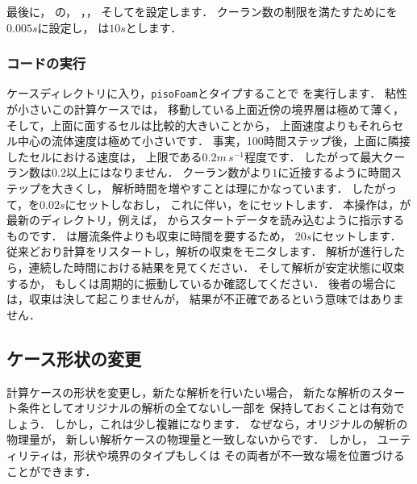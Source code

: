 最後に，
%
%
の，
，，
そしてを設定します．
クーラン数の制限を満たすためにを$0.005\unit{s}$に設定し，
は$10\unit{s}$とします．

\subsubsection{コードの実行}
\label{sssec:2.1.8.2}
ケースディレクトリに入り，\texttt{pisoFoam}とタイプすることで
を実行します．
粘性が小さいこの計算ケースでは，
移動している上面近傍の境界層は極めて薄く，
そして，上面に面するセルは比較的大きいことから，
上面速度よりもそれらセル中心の流体速度は極めて小さいです．
事実，100時間ステップ後，上面に隣接したセルにおける速度は，
上限である$0.2\unit{m\,s^{-1}}$程度です．
したがって最大クーラン数は$0.2$以上にはなりません．
クーラン数がより$1$に近接するように時間ステップを大きくし，
解析時間を増やすことは理にかなっています．
したがって，を$0.02\unit{s}$にセットしなおし，
これに伴い，をにセットします．
本操作は，が最新のディレクトリ，例えば，
からスタートデータを読み込むように指示するものです．
は層流条件よりも収束に時間を要するため，
$20\unit{s}$にセットします．
従来どおり計算をリスタートし，解析の収束をモニタします．
解析が進行したら，連続した時間における結果を見てください．
そして解析が安定状態に収束するか，
もしくは周期的に振動しているか確認してください．
後者の場合には，収束は決して起こりませんが，
結果が不正確であるという意味ではありません．


\subsection{ケース形状の変更}
\label{ssec:2.1.9}
計算ケースの形状を変更し，新たな解析を行いたい場合，
新たな解析のスタート条件としてオリジナルの解析の全てないし一部を
保持しておくことは有効でしょう．
しかし，これは少し複雑になります．
なぜなら，オリジナルの解析の物理量が，
新しい解析ケースの物理量と一致しないからです．
しかし，
%
%
ユーティリティは，形状や境界のタイプもしくは
その両者が不一致な場を位置づけることができます．

